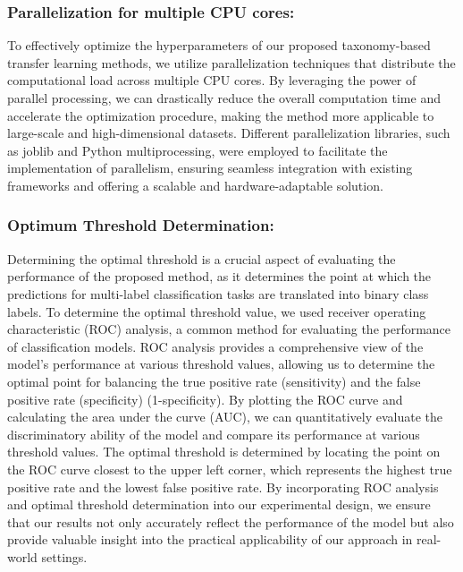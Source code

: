 \documentclass[review,1p,times,numbers]{elsarticle}
\begin{document}
\subsubsection{Parallelization for multiple CPU cores:}
To effectively optimize the hyperparameters of our proposed taxonomy-based transfer learning methods, we utilize parallelization techniques that distribute the computational load across multiple CPU cores. By leveraging the power of parallel processing, we can drastically reduce the overall computation time and accelerate the optimization procedure, making the method more applicable to large-scale and high-dimensional datasets. Different parallelization libraries, such as joblib and Python multiprocessing, were employed to facilitate the implementation of parallelism, ensuring seamless integration with existing frameworks and offering a scalable and hardware-adaptable solution.

\subsubsection{Optimum Threshold Determination:}
Determining the optimal threshold is a crucial aspect of evaluating the performance of the proposed method, as it determines the point at which the predictions for multi-label classification tasks are translated into binary class labels. To determine the optimal threshold value, we used receiver operating characteristic (ROC) analysis, a common method for evaluating the performance of classification models. ROC analysis provides a comprehensive view of the model's performance at various threshold values, allowing us to determine the optimal point for balancing the true positive rate (sensitivity) and the false positive rate (specificity) (1-specificity). By plotting the ROC curve and calculating the area under the curve (AUC), we can quantitatively evaluate the discriminatory ability of the model and compare its performance at various threshold values. The optimal threshold is determined by locating the point on the ROC curve closest to the upper left corner, which represents the highest true positive rate and the lowest false positive rate. By incorporating ROC analysis and optimal threshold determination into our experimental design, we ensure that our results not only accurately reflect the performance of the model but also provide valuable insight into the practical applicability of our approach in real-world settings.
\end{document}
